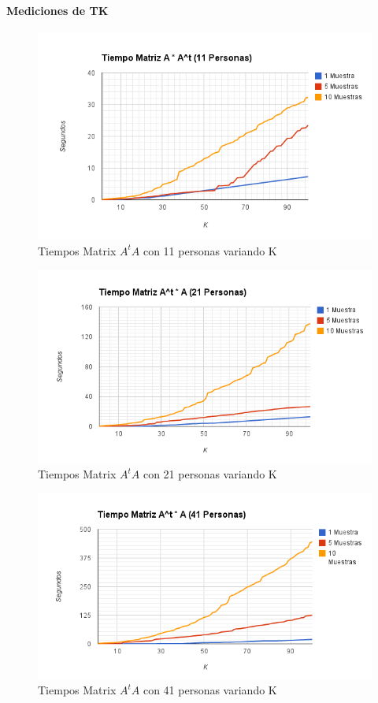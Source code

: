 \paragraph{Mediciones de TK }

\begin{figure}[H]
\includegraphics[width=1\textwidth]{img/imagea.png}
     \caption{Tiempos Matrix $A^tA$ con 11 personas variando K}
     \label{fig:figura1}
\end{figure}

\begin{figure}[H]
\includegraphics[width=1\textwidth]{img/imageb.png}
     \caption{Tiempos Matrix $A^tA$ con 21 personas variando K}
     \label{fig:figura1}
\end{figure}

\begin{figure}[H]
\includegraphics[width=1\textwidth]{img/imagec.png}
     \caption{Tiempos Matrix $A^tA$ con 41 personas variando K}
     \label{fig:figura1}
\end{figure}


